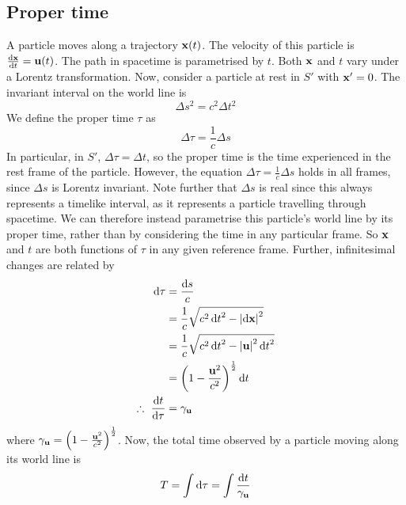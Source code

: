 \subsection{Proper time}
A particle moves along a trajectory \(\vb x(t)\).
The velocity of this particle is \(\dv{\vb x}{t} = \vb u(t)\).
The path in spacetime is parametrised by \(t\).
Both \(\vb x\) and \(t\) vary under a Lorentz transformation.
Now, consider a particle at rest in \(S'\) with \(\vb x' = 0\).
The invariant interval on the world line is
\[
	\Delta s^2 = c^2 \Delta t^2
\]
We define the proper time \(\tau\) as
\[
	\Delta \tau = \frac{1}{c}\Delta s
\]
In particular, in \(S'\), \(\Delta\tau = \Delta t\), so the proper time is the time experienced in the rest frame of the particle.
However, the equation \(\Delta \tau = \frac{1}{c}\Delta s\) holds in all frames, since \(\Delta s\) is Lorentz invariant.
Note further that \(\Delta s\) is real since this always represents a timelike interval, as it represents a particle travelling through spacetime.
We can therefore instead parametrise this particle's world line by its proper time, rather than by considering the time in any particular frame.
So \(\vb x\) and \(t\) are both functions of \(\tau\) in any given reference frame.
Further, infinitesimal changes are related by
\begin{align*}
	\dd{\tau}               & = \frac{\dd{s}}{c}                                       \\
	                        & = \frac{1}{c}\sqrt{c^2\dd{t}^2 - \abs{\dd{\vb x}}^2}     \\
	                        & = \frac{1}{c}\sqrt{c^2\dd{t}^2 - \abs{\vb u}^2 \dd{t}^2} \\
	                        & = \qty(1 - \frac{\vb u^2}{c^2})^{\frac{1}{2}}\dd{t}      \\
	\therefore\ \dv{t}{\tau} & = \gamma_{\vb u}
\end{align*}
where \(\gamma_{\vb u} = \qty(1 - \frac{\vb u^2}{c^2})^{\frac{1}{2}}\).
Now, the total time observed by a particle moving along its world line is
\[
	T = \int \dd{\tau} = \int \frac{\dd{t}}{\gamma_{\vb u}}
\]

